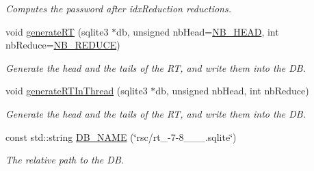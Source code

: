 \begin{DoxyCompactItemize}
\begin{DoxyCompactList}\small\item\em Computes the password after idx\+Reduction reductions. \end{DoxyCompactList}\item 
void \hyperlink{namespacebe_1_1esi_1_1secl_1_1pn_af8b773cad93b0eb78b89f69721e4bb1d}{generate\+RT} (sqlite3 $\ast$db, unsigned nb\+Head=\hyperlink{namespacebe_1_1esi_1_1secl_1_1pn_a3f7aaccb1bf4e47f92d72bf9b2471328}{N\+B\+\_\+\+H\+E\+AD}, int nb\+Reduce=\hyperlink{namespacebe_1_1esi_1_1secl_1_1pn_a9434f9e96778e243fcb677633df38598}{N\+B\+\_\+\+R\+E\+D\+U\+CE})
\begin{DoxyCompactList}\small\item\em Generate the head and the tails of the RT, and write them into the DB. \end{DoxyCompactList}\item 
void \hyperlink{namespacebe_1_1esi_1_1secl_1_1pn_aaf5216f5718720c15b5925f7e8a94d10}{generate\+R\+T\+In\+Thread} (sqlite3 $\ast$db, unsigned nb\+Head, int nb\+Reduce)
\begin{DoxyCompactList}\small\item\em Generate the head and the tails of the RT, and write them into the DB. \end{DoxyCompactList}\item 
const std\+::string \hyperlink{namespacebe_1_1esi_1_1secl_1_1pn_a78cbe51f7d2cc08391438e6f0c798e23}{D\+B\+\_\+\+N\+A\+ME} (\char`\"{}rsc/rt\+\_-\/7-\/8\+\_\+\_\+\_.\+sqlite\char`\"{})
\begin{DoxyCompactList}\small\item\em The relative path to the DB. \end{DoxyCompactList}\end{DoxyCompactItemize}
